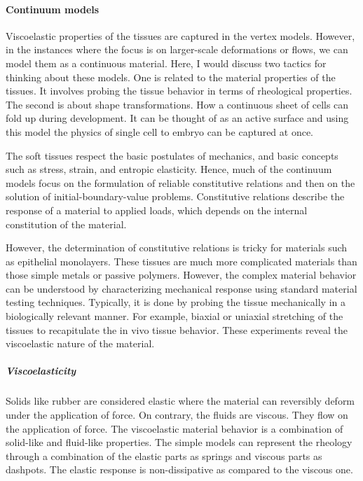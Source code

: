 \documentclass[
]{article}
\begin{document}
\hypertarget{continuum-models}{%
\paragraph{Continuum models}\label{continuum-models}}

Viscoelastic properties of the tissues are captured in the vertex
models. However, in the instances where the focus is on larger-scale
deformations or flows, we can model them as a continuous material. Here,
I would discuss two tactics for thinking about these models. One is
related to the material properties of the tissues. It involves probing
the tissue behavior in terms of rheological properties. The second is
about shape transformations. How a continuous sheet of cells can fold up
during development. It can be thought of as an active surface and using
this model the physics of single cell to embryo can be captured at once.

The soft tissues respect the basic postulates of mechanics, and basic
concepts such as stress, strain, and entropic elasticity. Hence, much of
the continuum models focus on the formulation of reliable constitutive
relations and then on the solution of initial-boundary-value problems.
Constitutive relations describe the response of a material to applied
loads, which depends on the internal constitution of the material.

However, the determination of constitutive relations is tricky for
materials such as epithelial monolayers. These tissues are much more
complicated materials than those simple metals or passive polymers.
However, the complex material behavior can be understood by
characterizing mechanical response using standard material testing
techniques. Typically, it is done by probing the tissue mechanically in
a biologically relevant manner. For example, biaxial or uniaxial
stretching of the tissues to recapitulate the in vivo tissue behavior.
These experiments reveal the viscoelastic nature of the material.

\hypertarget{viscoelasticity}{%
\subparagraph{Viscoelasticity}\label{viscoelasticity}}

Solids like rubber are considered elastic where the material can
reversibly deform under the application of force. On contrary, the
fluids are viscous. They flow on the application of force. The
viscoelastic material behavior is a combination of solid-like and
fluid-like properties. The simple models can represent the rheology
through a combination of the elastic parts as springs and viscous parts
as dashpots. The elastic response is non-dissipative as compared to the
viscous one.
\end{document}
